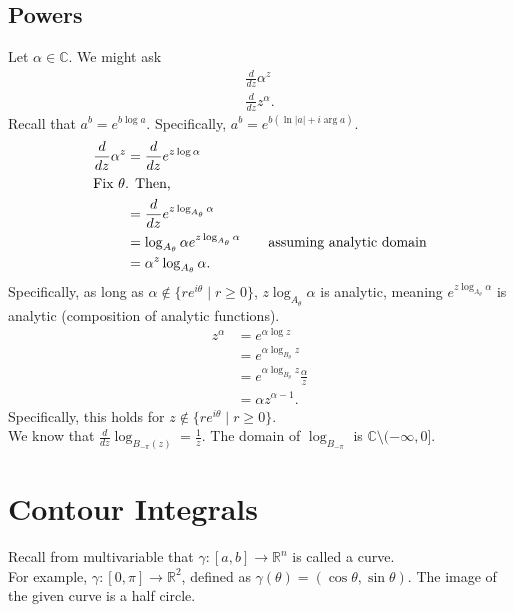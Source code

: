 \documentclass[10pt]{extarticle}
\newcommand{\R}{\mathbb{R}}
\newcommand{\C}{\mathbb{C}}
\begin{document}
  \subsection{Powers}%
  Let $\alpha \in \C$. We might ask
  \begin{align*}
    \frac{d}{dz}\alpha^{z}\\
    \frac{d}{dz}z^{\alpha}.
  \end{align*}
  Recall that $a^b = e^{b \log a}$. Specifically, $a^b = e^{b (\ln|a| + i\arg a)}$.
  \begin{align*}
    \frac{d}{dz}\alpha^{z} &= \frac{d}{dz}e^{z\log \alpha}\\
    \intertext{Fix $\theta$. Then,}
                           &= \frac{d}{dz}e^{z\log_{A_{\theta}}\alpha}\\
                           &= \log_{A_{\theta}}\alpha e^{z\log_{A_{\theta}}\alpha} \tag*{assuming analytic domain}\\
                           &= \alpha^{z}\log_{A_{\theta}}\alpha.
  \end{align*}
  Specifically, as long as $\alpha \notin \{re^{i\theta}\mid r \geq 0\}$, $z\log_{A_{\theta}}\alpha$ is analytic, meaning $e^{z\log_{A_{\theta}}\alpha}$ is analytic (composition of analytic functions).
  \begin{align*}
    z^{\alpha} &= e^{\alpha \log z}\\
               &= e^{\alpha \log_{B_{\theta}} z}\\
               &= e^{\alpha \log_{B_{\theta}}z} \frac{\alpha}{z}\\
               &= \alpha z^{\alpha - 1}.
  \end{align*}
  Specifically, this holds for $z\notin \{re^{i\theta}\mid r\geq 0\}$.\\

  We know that $\frac{d}{dz}\log_{B_{-\pi}(z)} = \frac{1}{z}$. The domain of $\log_{B_{-\pi}}$ is $\C\setminus (-\infty,0]$.
  \section{Contour Integrals}%
  Recall from multivariable that $\gamma: [a,b]\rightarrow \R^n$ is called a curve.\\

  For example, $\gamma: [0,\pi] \rightarrow \R^2$, defined as $\gamma(\theta) = (\cos\theta,\sin\theta)$. The image of the given curve is a half circle.\\
\end{document}
